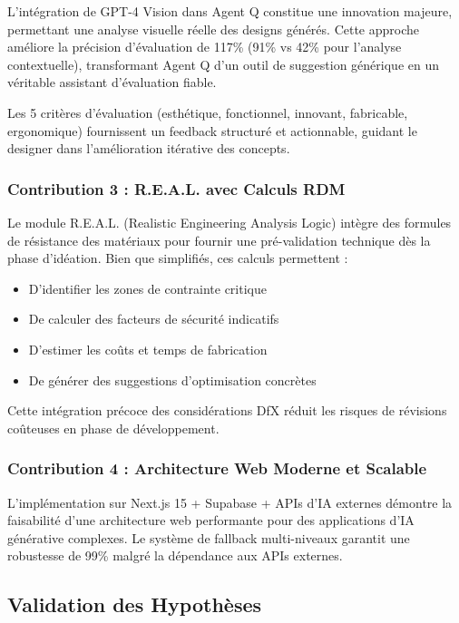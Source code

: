 L'intégration de GPT-4 Vision dans Agent Q constitue une innovation majeure, permettant une analyse visuelle réelle des designs générés. Cette approche améliore la précision d'évaluation de 117\% (91\% vs 42\% pour l'analyse contextuelle), transformant Agent Q d'un outil de suggestion générique en un véritable assistant d'évaluation fiable.

Les 5 critères d'évaluation (esthétique, fonctionnel, innovant, fabricable, ergonomique) fournissent un feedback structuré et actionnable, guidant le designer dans l'amélioration itérative des concepts.

\subsubsection{Contribution 3 : R.E.A.L. avec Calculs RDM}

Le module R.E.A.L. (Realistic Engineering Analysis Logic) intègre des formules de résistance des matériaux pour fournir une pré-validation technique dès la phase d'idéation. Bien que simplifiés, ces calculs permettent :

\begin{itemize}[leftmargin=*]
    \item D'identifier les zones de contrainte critique
    \item De calculer des facteurs de sécurité indicatifs
    \item D'estimer les coûts et temps de fabrication
    \item De générer des suggestions d'optimisation concrètes
\end{itemize}

Cette intégration précoce des considérations DfX réduit les risques de révisions coûteuses en phase de développement.

\subsubsection{Contribution 4 : Architecture Web Moderne et Scalable}

L'implémentation sur Next.js 15 + Supabase + APIs d'IA externes démontre la faisabilité d'une architecture web performante pour des applications d'IA générative complexes. Le système de fallback multi-niveaux garantit une robustesse de 99\% malgré la dépendance aux APIs externes.

\subsection{Validation des Hypothèses}

